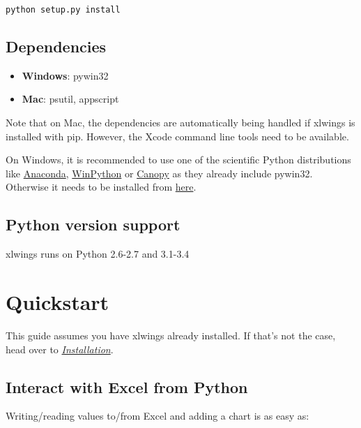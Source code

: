 \documentclass[letterpaper,11pt,english]{sphinxmanual}
\begin{document}
\begin{Verbatim}[commandchars=\\\{\}]
python setup.py install
\end{Verbatim}


\section{Dependencies}
\label{installation:dependencies}\begin{itemize}
\item {} 
\textbf{Windows}: pywin32

\item {} 
\textbf{Mac}: psutil, appscript

\end{itemize}

Note that on Mac, the dependencies are automatically being handled if xlwings is installed with pip. However, the Xcode
command line tools need to be available.

On Windows, it is recommended to use one of the scientific Python distributions like
\href{https://store.continuum.io/cshop/anaconda/}{Anaconda},
\href{http://winpython.sourceforge.net/}{WinPython} or
\href{https://www.enthought.com/products/canopy/}{Canopy} as they already include pywin32. Otherwise it needs to be
installed from \href{http://sourceforge.net/projects/pywin32/files/pywin32/}{here}.


\section{Python version support}
\label{installation:python-version-support}
xlwings runs on Python 2.6-2.7 and 3.1-3.4


\chapter{Quickstart}
\label{quickstart::doc}\label{quickstart:quickstart}
This guide assumes you have xlwings already installed. If that's not the case, head over to {\hyperref[installation:installation]{\emph{Installation}}}.


\section{Interact with Excel from Python}
\label{quickstart:interact-with-excel-from-python}
Writing/reading values to/from Excel and adding a chart is as easy as:
\end{document}
